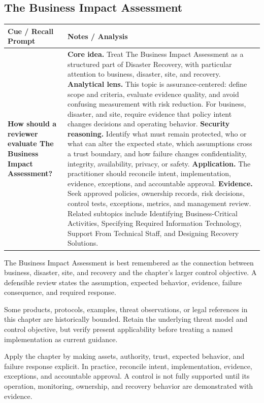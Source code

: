 \documentclass[11pt]{article}
\newcommand{\CornellHeader}{%
\rowcolor{Navy}\color{white}\bfseries Cue / Recall Prompt & \color{white}\bfseries Notes / Analysis\\\hline}
\newcommand{\CornellRow}[2]{%
\cellcolor{CueGray}\RaggedRight\textbf{#1} & \RaggedRight #2\\\hline}
\begin{document}
\subsection*{The Business Impact Assessment}
\begin{longtable}{>{\RaggedRight\arraybackslash}p{}|>{\RaggedRight\arraybackslash}p{}}
\CornellHeader
\CornellRow{How should a reviewer evaluate The Business Impact Assessment?}{\textbf{Core idea.} Treat The Business Impact Assessment as a structured part of Disaster Recovery, with particular attention to business, disaster, site, and recovery. \textbf{Analytical lens.} This topic is assurance-centered: define scope and criteria, evaluate evidence quality, and avoid confusing measurement with risk reduction. For business, disaster, and site, require evidence that policy intent changes decisions and operating behavior. \textbf{Security reasoning.} Identify what must remain protected, who or what can alter the expected state, which assumptions cross a trust boundary, and how failure changes confidentiality, integrity, availability, privacy, or safety. \textbf{Application.} The practitioner should reconcile intent, implementation, evidence, exceptions, and accountable approval. \textbf{Evidence.} Seek approved policies, ownership records, risk decisions, control tests, exceptions, metrics, and management review. Related subtopics include Identifying Business-Critical Activities, Specifying Required Information Technology, Support From Technical Staff, and Designing Recovery Solutions.}
\end{longtable}
\begin{topicsummary}
The Business Impact Assessment is best remembered as the connection between business, disaster, site, and recovery and the chapter's larger control objective. A defensible review states the assumption, expected behavior, evidence, failure consequence, and required response.
\end{topicsummary}
\begin{historybox}
Some products, protocols, examples, threat observations, or legal references in this chapter are historically bounded. Retain the underlying threat model and control objective, but verify present applicability before treating a named implementation as current guidance.
\end{historybox}
\begin{defensebox}
Apply the chapter by making assets, authority, trust, expected behavior, and failure response explicit. In practice, reconcile intent, implementation, evidence, exceptions, and accountable approval. A control is not fully supported until its operation, monitoring, ownership, and recovery behavior are demonstrated with evidence.
\end{defensebox}
\end{document}
